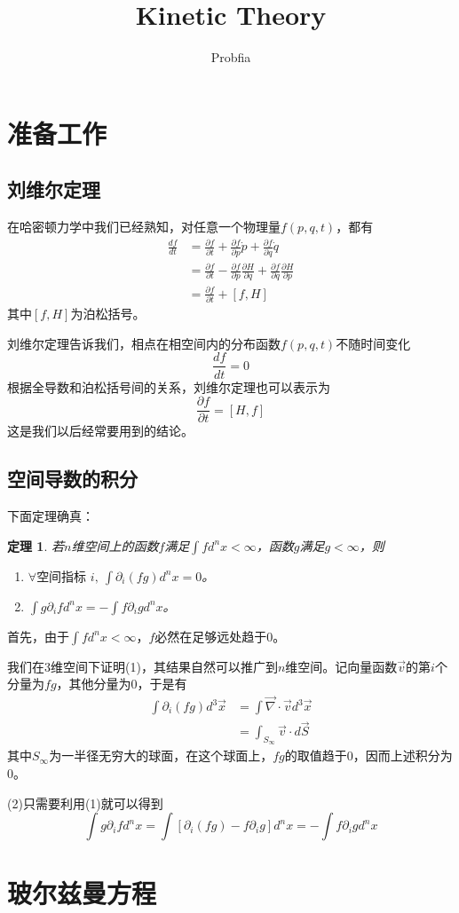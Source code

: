 \documentclass[a4paper,11pt]{ctexart}
\title{Kinetic Theory}
\author{Probfia}
\date{}
\newcommand{\beq}{\begin{equation}}
\newcommand{\eeq}{\end{equation}}
\newcommand{\bea}{\begin{equation}\begin{aligned}}
\newcommand{\eea}{\end{aligned}\end{equation}}
\newcommand{\pfrac}[2]{\frac{\partial #1}{\partial #2}}
\newtheorem{thm}{定理}[section]
\begin{document}
\maketitle
\tableofcontents
\section{准备工作}
\subsection{刘维尔定理}
在哈密顿力学中我们已经熟知，对任意一个物理量$f(p,q,t)$，都有
\bea
\frac{df}{dt} &= \pfrac{f}{t} + \pfrac{f}{p} \dot{p} + \pfrac{f}{q} \dot{q} \\
&= \pfrac{f}{t} - \pfrac{f}{p} \pfrac{H}{q} + \pfrac{f}{q} \pfrac{H}{p} \\
&= \pfrac{f}{t} + [f,H]
\eea
其中$[f,H]$为泊松括号。
\par
刘维尔定理告诉我们，相点在相空间内的分布函数$f(p,q,t)$不随时间变化
\beq
\frac{df}{dt} = 0
\eeq
根据全导数和泊松括号间的关系，刘维尔定理也可以表示为
\beq
\pfrac{f}{t} = [H,f]
\eeq
这是我们以后经常要用到的结论。
\subsection{空间导数的积分}
下面定理确真：
\begin{thm}
若$n$维空间上的函数$f$满足$\int f d^n x < \infty$，函数$g$满足$g < \infty$，则
\begin{enumerate}
\item[(1)] $\forall \text{空间指标\ } i,\ \int \partial_i (fg) d^n x= 0$。
\item[(2)] $\int g\partial_i f d^n x = - \int f \partial_i g d^n x $。
\end{enumerate}
\end{thm}
首先，由于$\int f d^n x < \infty$，$f$必然在足够远处趋于0。\par
我们在3维空间下证明(1)，其结果自然可以推广到$n$维空间。记向量函数$\vec{v}$的第$i$个分量为$fg$，其他分量为$0$，于是有
\bea
\int \partial_i (fg) d^3 \vec{x} &= \int \vec{\nabla} \cdot \vec{v} d^3 \vec{x} \\
&= \int_{S_\infty} \vec{v} \cdot d\vec{S}
\eea
其中$S_\infty$为一半径无穷大的球面，在这个球面上，$fg$的取值趋于0，因而上述积分为0。
\par
(2)只需要利用(1)就可以得到
\beq
\int g\partial_i f d^n x = \int [\partial_i(fg) - f \partial_i g]d^n x =  - \int f \partial_i g d^n x 
\eeq

\section{玻尔兹曼方程}
\end{document}
